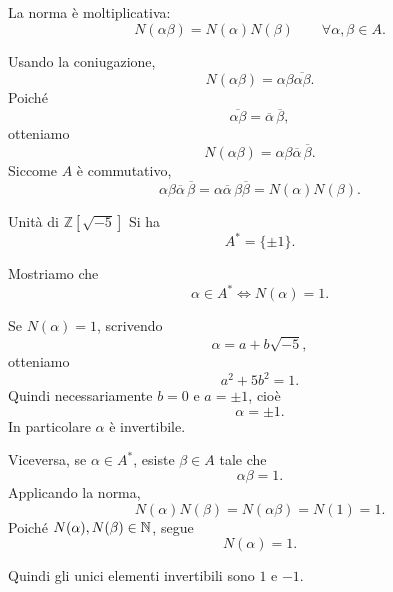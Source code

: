\documentclass[a4paper]{article}
\begin{document}
\begin{radioactive}
\begin{snippetproposition}{}
    La norma è moltiplicativa:
    \[
        N(\alpha\beta)=N(\alpha)N(\beta)
        \qquad
        \forall \alpha,\beta\in A.
    \]
\end{snippetproposition}
\end{radioactive}

\begin{radioactive}
\begin{snippetproof}{}
    Usando la coniugazione,
    \[
        N(\alpha\beta)
        =
        \alpha\beta\overline{\alpha\beta}.
    \]
    Poiché
    \[
        \overline{\alpha\beta}
        =
        \overline{\alpha}\,\overline{\beta},
    \]
    otteniamo
    \[
        N(\alpha\beta)
        =
        \alpha\beta\overline{\alpha}\,\overline{\beta}.
    \]
    Siccome \(A\) è commutativo,
    \[
        \alpha\beta\overline{\alpha}\,\overline{\beta}
        =
        \alpha\overline{\alpha}\,\beta\overline{\beta}
        =
        N(\alpha)N(\beta).
    \]
\end{snippetproof}
\end{radioactive}

\begin{radioactive}
\begin{snippetproposition}{Unità di \(\mathbb{Z}[\sqrt{-5}]\)}
    Si ha
    \[
        A^\ast=\{\pm 1\}.
    \]
\end{snippetproposition}
\end{radioactive}

\begin{radioactive}
\begin{snippetproof}{}
    Mostriamo che
    \[
        \alpha\in A^\ast
        \iff
        N(\alpha)=1.
    \]

    Se \(N(\alpha)=1\), scrivendo
    \[
        \alpha=a+b\sqrt{-5},
    \]
    otteniamo
    \[
        a^2+5b^2=1.
    \]
    Quindi necessariamente \(b=0\) e \(a=\pm 1\), cioè
    \[
        \alpha=\pm 1.
    \]
    In particolare \(\alpha\) è invertibile.

    Viceversa, se \(\alpha\in A^\ast\), esiste \(\beta\in A\) tale che
    \[
        \alpha\beta=1.
    \]
    Applicando la norma,
    \[
        N(\alpha)N(\beta)
        =
        N(\alpha\beta)
        =
        N(1)
        =
        1.
    \]
    Poiché \(N(\alpha),N(\beta)\in\mathbb{N}\), segue
    \[
        N(\alpha)=1.
    \]

    Quindi gli unici elementi invertibili sono \(1\) e \(-1\).
\end{snippetproof}
\end{radioactive}
\end{document}

